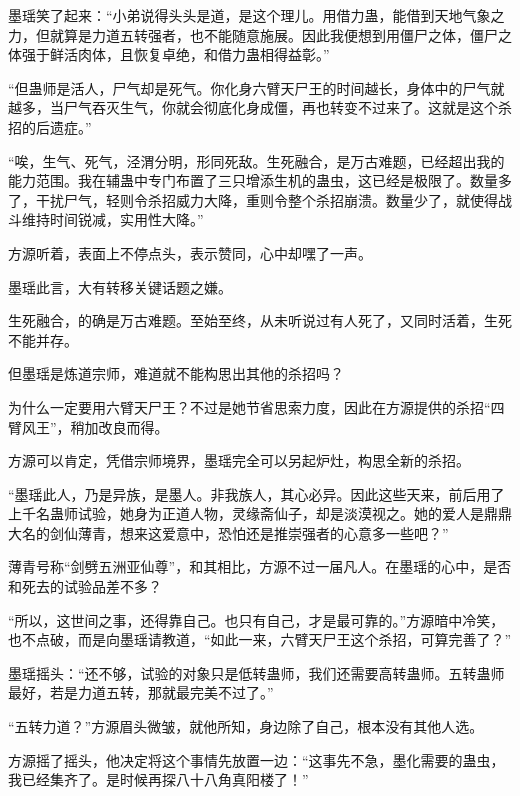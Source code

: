 \begin{this_body}
墨瑶笑了起来：“小弟说得头头是道，是这个理儿。用借力蛊，能借到天地气象之力，但就算是力道五转强者，也不能随意施展。因此我便想到用僵尸之体，僵尸之体强于鲜活肉体，且恢复卓绝，和借力蛊相得益彰。”

“但蛊师是活人，尸气却是死气。你化身六臂天尸王的时间越长，身体中的尸气就越多，当尸气吞灭生气，你就会彻底化身成僵，再也转变不过来了。这就是这个杀招的后遗症。”

“唉，生气、死气，泾渭分明，形同死敌。生死融合，是万古难题，已经超出我的能力范围。我在辅蛊中专门布置了三只增添生机的蛊虫，这已经是极限了。数量多了，干扰尸气，轻则令杀招威力大降，重则令整个杀招崩溃。数量少了，就使得战斗维持时间锐减，实用性大降。”

方源听着，表面上不停点头，表示赞同，心中却嘿了一声。

墨瑶此言，大有转移关键话题之嫌。

生死融合，的确是万古难题。至始至终，从未听说过有人死了，又同时活着，生死不能并存。

但墨瑶是炼道宗师，难道就不能构思出其他的杀招吗？

为什么一定要用六臂天尸王？不过是她节省思索力度，因此在方源提供的杀招“四臂风王”，稍加改良而得。

方源可以肯定，凭借宗师境界，墨瑶完全可以另起炉灶，构思全新的杀招。

“墨瑶此人，乃是异族，是墨人。非我族人，其心必异。因此这些天来，前后用了上千名蛊师试验，她身为正道人物，灵缘斋仙子，却是淡漠视之。她的爱人是鼎鼎大名的剑仙薄青，想来这爱意中，恐怕还是推崇强者的心意多一些吧？”

薄青号称“剑劈五洲亚仙尊”，和其相比，方源不过一届凡人。在墨瑶的心中，是否和死去的试验品差不多？

“所以，这世间之事，还得靠自己。也只有自己，才是最可靠的。”方源暗中冷笑，也不点破，而是向墨瑶请教道，“如此一来，六臂天尸王这个杀招，可算完善了？”

墨瑶摇头：“还不够，试验的对象只是低转蛊师，我们还需要高转蛊师。五转蛊师最好，若是力道五转，那就最完美不过了。”

“五转力道？”方源眉头微皱，就他所知，身边除了自己，根本没有其他人选。

方源摇了摇头，他决定将这个事情先放置一边：“这事先不急，墨化需要的蛊虫，我已经集齐了。是时候再探八十八角真阳楼了！”

\end{this_body}

